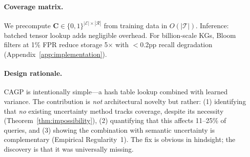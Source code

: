 \paragraph{Coverage matrix.}
We precompute $\mathbf{C} \in \{0,1\}^{|\mathcal{E}| \times |\mathcal{R}|}$ from training data in $O(|\mathcal{T}|)$. Inference: batched tensor lookup adds negligible overhead. For billion-scale KGs, Bloom filters at 1\% FPR reduce storage 5$\times$ with $<$0.2pp recall degradation (Appendix~\ref{app:implementation}).

\paragraph{Design rationale.}
CAGP is intentionally simple---a hash table lookup combined with learned variance. The contribution is \emph{not} architectural novelty but rather: (1) identifying that \emph{no} existing uncertainty method tracks coverage, despite its necessity (Theorem~\ref{thm:impossibility}), (2) quantifying that this affects 11--25\% of queries, and (3) showing the combination with semantic uncertainty is complementary (Empirical Regularity~1). The fix is obvious in hindsight; the discovery is that it was universally missing.
